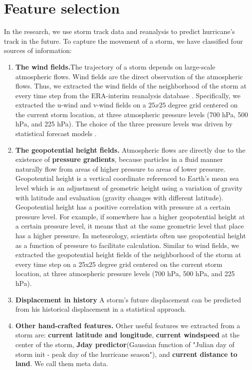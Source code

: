 \section{Feature selection}
In the research, we use storm track data and reanalysis to predict hurricane's track in the future. To capture the movement of a storm, we have classified four sources of information: 
\begin{enumerate}[leftmargin=2em]
	\item \textbf{The wind fields.}The trajectory of a storm depends on large-scale atmospheric flows. Wind fields are the direct observation of the atmospheric flows. Thus, we extracted the wind fields of the neighborhood of the storm at every time step from the ERA-interim reanalysis database \cite{dee2011era}. Specifically, we extracted the u-wind and v-wind fields on a $25x25$ degree grid centered on the current storm location, at three atmospheric pressure levels (700 hPa, 500 hPa, and 225 hPa). The choice of the three pressure levels was driven by statistical forecast models \cite{demaria2005further}. 
	\item \textbf{The geopotential height fields.} Atmospheric flows are directly due to the existence of \textbf{pressure gradients}, because particles in a fluid manner naturally flow from areas of higher pressure to areas of lower pressure. Geopotential height is a vertical coordinate referenced to Earth's mean sea level which is an adjustment of geometric height using a variation of gravity with latitude and evaluation (gravity changes with different latitude). Geopotential height has a positive correlation with pressure at a certain pressure level. For example, if somewhere has a higher geopotential height at a certain pressure level, it means that at the same geometric level that place has a higher pressure. In meteorology, scientists often use geopotential height as a function of pressure to facilitate calculation. Similar to wind fields, we extracted the geopotential height fields of the neighborhood of the storm at every time step on a 25x25 degree grid centered on the current storm location, at three atmospheric pressure levels (700 hPa, 500 hPa, and 225 hPa).
	
	\item \textbf{Displacement in history} A storm's future displacement can be predicted from his historical displacement in a statistical approach.
	
	\item \textbf{Other hand-crafted features.} Other useful features we extracted from a storm are: \textbf{current latitude and longitude}, \textbf{current windspeed} at the center of the storm, \textbf{Jday predictor}(Gaussian function of "Julian day of storm init - peak day of the hurricane season"\cite{demaria2005further}), and \textbf{current distance to land}. We call them meta data.
\end{enumerate}

